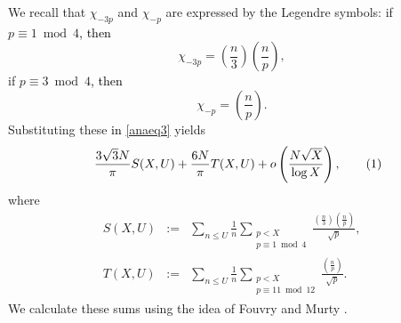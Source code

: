 \documentclass[a4paper, 11pt]{article}
\theoremstyle{plain}
\newcommand{\?}{\textcolor{red}{??}}
\begin{document}
We recall that ${\chi}_{-3p}$ and ${\chi}_{-p}$ are expressed by the Legendre symbols: 
 if $p \equiv 1\bmod 4$\textcolor{black}{, then}
    \[
    {\chi}_{-3p}= \left( \frac{n}{3} \right) \left( \frac{n}{p} \right),
    \]
if $p \equiv 3 \bmod 4$\textcolor{black}{, then}
     \[
    {\chi}_{-p}= \left( \frac{n}{p} \right).
    \]
Substituting these \textcolor{black}{in} \eqref{anaeq3} yields
\begin{align*}
\label{anaeq4}
   && \frac{3\sqrt{3}N}{\pi}S(X,U) +  \frac{6N}{\pi} T(X,U)
    + o \left( \frac{N\sqrt{X}}{\log X} \right),
     \stepcounter{equation}\tag{\theequation} 
\end{align*}
where
\begin{eqnarray*}
    S(X,U)&:=& \sum_{n \le U} \frac{1}{n} \sum_{\substack{p<X \\ p \equiv1 \bmod 4}}\frac{\left( \frac{n}{3} \right) \left( \frac{n}{p} \right)}{\sqrt{p}},\\
    T(X,U)&:=&\sum_{n \le U} \frac{1}{n} \sum_{\substack{p<X \\ p \equiv 11\bmod 12}}\frac{\left( \frac{n}{p} \right)}{\sqrt{p}}.
\end{eqnarray*}
We calculate these sums using the idea of Fouvry and Murty \cite[Theorem 4]{FM01}.
\end{document}
